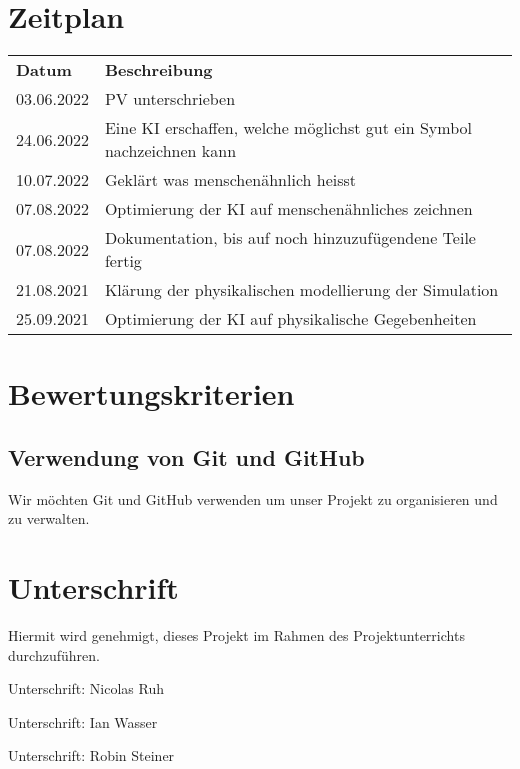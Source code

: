 \documentclass{article}
\begin{document}
\section{Zeitplan}
\label{chap:zeitplan}
\begin{table}[H]
    \begin{tabular}{ll}
    \textbf{Datum} & \textbf{Beschreibung}                                                                         \\
    03.06.2022     & PV unterschrieben                                                                             \\
    24.06.2022     & Eine KI erschaffen, welche möglichst gut ein Symbol nachzeichnen kann                         \\
    10.07.2022     & Geklärt was menschenähnlich heisst                                                            \\
    07.08.2022     & Optimierung der KI auf menschenähnliches zeichnen                                             \\
    07.08.2022     & Dokumentation, bis auf noch hinzuzufügendene Teile fertig                                     \\
    21.08.2021     & Klärung der physikalischen modellierung der Simulation                                        \\
    25.09.2021     & Optimierung der KI auf physikalische Gegebenheiten                                            \\
    \end{tabular}
\end{table}

\section{Bewertungskriterien}
\subsection{Verwendung von Git und GitHub}
\label{chap:git_github}
Wir möchten Git und GitHub verwenden um unser Projekt zu organisieren und zu verwalten.

\section{Unterschrift}
\label{chap:unterschrift}

Hiermit wird genehmigt, dieses Projekt im Rahmen des Projektunterrichts
durchzuführen.

\vspace*{1cm}

Unterschrift: \hrulefill Nicolas Ruh \vspace*{2cm}

Unterschrift: \hrulefill Ian Wasser \vspace*{2cm}

Unterschrift: \hrulefill Robin Steiner \vspace*{2cm}

\printbibliography[heading=bibintoc]
\end{document}
